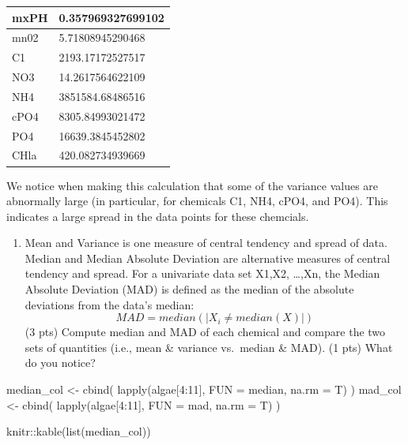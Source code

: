 \documentclass[
]{article}
\newenvironment{Shaded}{\begin{snugshade}}{\end{snugshade}}
\newcommand{\AttributeTok}[1]{\textcolor[rgb]{0.77,0.63,0.00}{#1}}
\newcommand{\DecValTok}[1]{\textcolor[rgb]{0.00,0.00,0.81}{#1}}
\newcommand{\FunctionTok}[1]{\textcolor[rgb]{0.00,0.00,0.00}{#1}}
\newcommand{\NormalTok}[1]{#1}
\newcommand{\OtherTok}[1]{\textcolor[rgb]{0.56,0.35,0.01}{#1}}
\newcommand{\SpecialCharTok}[1]{\textcolor[rgb]{0.00,0.00,0.00}{#1}}
\providecommand{\tightlist}{%
  \setlength{\itemsep}{0pt}\setlength{\parskip}{0pt}}
\begin{document}
\begin{table}

\centering
\begin{tabular}[t]{l|l}
\hline
mxPH & 0.357969327699102\\
\hline
mn02 & 5.71808945290468\\
\hline
C1 & 2193.17172527517\\
\hline
NO3 & 14.2617564622109\\
\hline
NH4 & 3851584.68486516\\
\hline
cPO4 & 8305.84993021472\\
\hline
PO4 & 16639.3845452802\\
\hline
CHla & 420.082734939669\\
\hline
\end{tabular}
\end{table}

We notice when making this calculation that some of the variance values
are abnormally large (in particular, for chemicals C1, NH4, cPO4, and
PO4). This indicates a large spread in the data points for these
chemcials.

\begin{enumerate}
\def\labelenumi{\alph{enumi}.}
\setcounter{enumi}{2}
\tightlist
\item
  Mean and Variance is one measure of central tendency and spread of
  data. Median and Median Absolute Deviation are alternative measures of
  central tendency and spread. For a univariate data set X1,X2,
  \ldots,Xn, the Median Absolute Deviation (MAD) is defined as the
  median of the absolute deviations from the data's median:
  \[MAD = median(|X_i ≠ median(X)|)\] (3 pts) Compute median and MAD of
  each chemical and compare the two sets of quantities (i.e., mean \&
  variance vs.~median \& MAD). (1 pts) What do you notice?
\end{enumerate}

\begin{Shaded}
\begin{Highlighting}[]
\NormalTok{median\_col }\OtherTok{\textless{}{-}} \FunctionTok{cbind}\NormalTok{(}
  \FunctionTok{lapply}\NormalTok{(algae[}\DecValTok{4}\SpecialCharTok{:}\DecValTok{11}\NormalTok{], }\AttributeTok{FUN =}\NormalTok{ median, }\AttributeTok{na.rm =}\NormalTok{ T)}
\NormalTok{)}
\NormalTok{mad\_col }\OtherTok{\textless{}{-}} \FunctionTok{cbind}\NormalTok{(}
  \FunctionTok{lapply}\NormalTok{(algae[}\DecValTok{4}\SpecialCharTok{:}\DecValTok{11}\NormalTok{], }\AttributeTok{FUN =}\NormalTok{ mad, }\AttributeTok{na.rm =}\NormalTok{ T)}
\NormalTok{)}

\NormalTok{knitr}\SpecialCharTok{::}\FunctionTok{kable}\NormalTok{(}\FunctionTok{list}\NormalTok{(median\_col))}
\end{Highlighting}
\end{Shaded}
\end{document}
